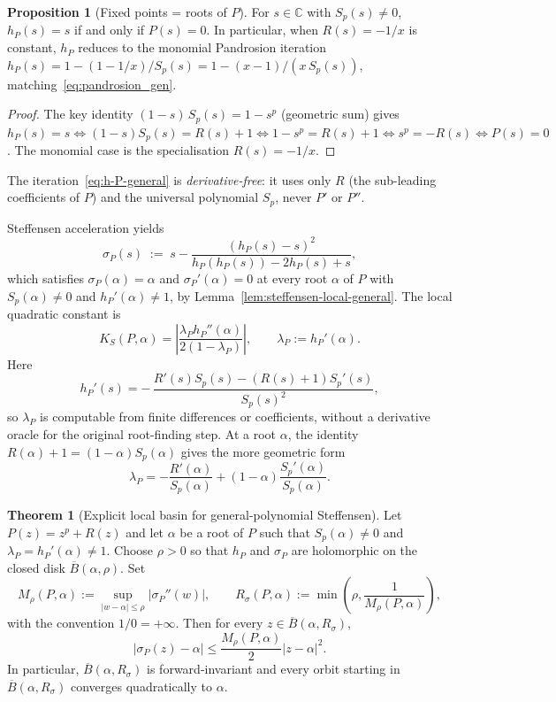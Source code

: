 \documentclass[11pt,a4paper]{article}
\theoremstyle{definition}
\newtheorem{theorem}{Theorem}[section]
\newtheorem{proposition}{Proposition}[section]
\begin{document}
\begin{proposition}[Fixed points = roots of $P$]\label{prop:hP-fixed-points}
For $s \in \mathbb{C}$ with $S_p(s) \neq 0$, $h_P(s) = s$ if and only if $P(s) = 0$. In particular, when $R(s) = -1/x$ is constant, $h_P$ reduces to the monomial Pandrosion iteration $h_P(s) = 1 - (1 - 1/x)/S_p(s) = 1 - (x-1)/(x\,S_p(s))$, matching~\eqref{eq:pandrosion_gen}.
\end{proposition}

\begin{proof}
The key identity $(1 - s)\,S_p(s) = 1 - s^p$ (geometric sum) gives $h_P(s) = s \iff (1-s)S_p(s) = R(s)+1 \iff 1 - s^p = R(s)+1 \iff s^p = -R(s) \iff P(s) = 0$. The monomial case is the specialisation $R(s) = -1/x$.
\end{proof}

The iteration~\eqref{eq:h-P-general} is \emph{derivative-free}: it uses only $R$ (the sub-leading coefficients of $P$) and the universal polynomial $S_p$, never $P'$ or $P''$.

Steffensen acceleration yields
\[
  \sigma_P(s) \;:=\; s - \frac{(h_P(s) - s)^2}{h_P(h_P(s)) - 2h_P(s) + s},
\]
which satisfies $\sigma_P(\alpha) = \alpha$ and $\sigma_P'(\alpha) = 0$ at every root $\alpha$ of $P$ with $S_p(\alpha) \neq 0$ and $h_P'(\alpha) \neq 1$, by Lemma~\ref{lem:steffensen-local-general}. The local quadratic constant is
\[
  K_S(P,\alpha)
  =
  \left|\frac{\lambda_P h_P''(\alpha)}{2(1-\lambda_P)}\right|,
  \qquad
  \lambda_P:=h_P'(\alpha).
\]
Here
\[
  h_P'(s)
  =
  -\,\frac{R'(s)S_p(s)-(R(s)+1)S_p'(s)}{S_p(s)^2},
\]
so $\lambda_P$ is computable from finite differences or coefficients, without a derivative oracle for the original root-finding step. At a root $\alpha$, the identity $R(\alpha)+1=(1-\alpha)S_p(\alpha)$ gives the more geometric form
\[
  \lambda_P
  =
  -\frac{R'(\alpha)}{S_p(\alpha)}
  +(1-\alpha)\frac{S_p'(\alpha)}{S_p(\alpha)}.
\]

\begin{theorem}[Explicit local basin for general-polynomial Steffensen]\label{thm:general-local-basin}
Let $P(z)=z^p+R(z)$ and let $\alpha$ be a root of $P$ such that
$S_p(\alpha)\ne0$ and $\lambda_P=h_P'(\alpha)\ne1$. Choose $\rho>0$ so that
$h_P$ and $\sigma_P$ are holomorphic on the closed disk
$\overline{B}(\alpha,\rho)$. Set
\[
  M_\rho(P,\alpha)
  :=
  \sup_{|w-\alpha|\le \rho} |\sigma_P''(w)|,
  \qquad
  R_\sigma(P,\alpha)
  :=
  \min\!\left(\rho,\frac{1}{M_\rho(P,\alpha)}\right),
\]
with the convention $1/0=+\infty$. Then for every
$z\in \overline{B}(\alpha,R_\sigma)$,
\[
  |\sigma_P(z)-\alpha|
  \le
  \frac{M_\rho(P,\alpha)}{2}|z-\alpha|^2.
\]
In particular, $\overline{B}(\alpha,R_\sigma)$ is forward-invariant and every
orbit starting in $\overline{B}(\alpha,R_\sigma)$ converges quadratically to
$\alpha$.
\end{theorem}
\end{document}
